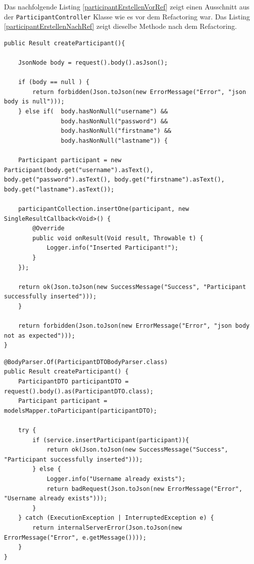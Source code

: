 Das nachfolgende Listing \ref{participantErstellenVorRef} zeigt einen Ausschnitt aus der \texttt{Participant\-Controller} Klasse wie es vor dem Refactoring war. Das Listing \ref{participantErstellenNachRef} zeigt dieselbe Methode nach dem Refactoring.

\lstset{language=JAVA, showstringspaces=false, frame=single, captionpos=b, label=createParticipant, breaklines=true, numbers=left}
\begin{lstlisting}[caption={Participant erstellen vor Refactoring}, label=participantErstellenVorRef]
public Result createParticipant(){

    JsonNode body = request().body().asJson();

    if (body == null ) {
        return forbidden(Json.toJson(new ErrorMessage("Error", "json body is null")));
    } else if(  body.hasNonNull("username") &&
            	body.hasNonNull("password") &&
            	body.hasNonNull("firstname") &&
            	body.hasNonNull("lastname")) {

    Participant participant = new Participant(body.get("username").asText(), body.get("password").asText(), body.get("firstname").asText(), body.get("lastname").asText());

    participantCollection.insertOne(participant, new SingleResultCallback<Void>() {
        @Override
        public void onResult(Void result, Throwable t) {
            Logger.info("Inserted Participant!");
        }
    });

    return ok(Json.toJson(new SuccessMessage("Success", "Participant successfully inserted")));
    }

    return forbidden(Json.toJson(new ErrorMessage("Error", "json body not as expected")));
}
\end{lstlisting}

\begin{lstlisting}[caption={Participant erstellen nach Refactoring}, label=participantErstellenNachRef]
@BodyParser.Of(ParticipantDTOBodyParser.class)
public Result createParticipant() {
    ParticipantDTO participantDTO = request().body().as(ParticipantDTO.class);
    Participant participant = modelsMapper.toParticipant(participantDTO);

    try {
        if (service.insertParticipant(participant)){
            return ok(Json.toJson(new SuccessMessage("Success", "Participant successfully inserted")));
        } else {
            Logger.info("Username already exists");
            return badRequest(Json.toJson(new ErrorMessage("Error", "Username already exists")));
        }
    } catch (ExecutionException | InterruptedException e) {
        return internalServerError(Json.toJson(new ErrorMessage("Error", e.getMessage())));
    }
}
\end{lstlisting}


